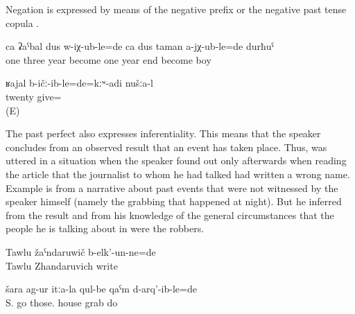 Negation is expressed by means of the negative prefix   or the negative past tense copula  .

\begin{exe}
	\ex	\label{ex:‎One boy had turned three, the other was not even one year old analytic}
	\gll	ca	ʡaˁbal	dus	w-iχ-ub-le=de	ca	dus	taman	a-jχ-ub-le=de	durħuˁ\\
		one	three	year	become		one	year	end	become	boy\\
	\glt	{}

	\ex	\label{ex:‎ ‎‎We had not given twenty analytic}
	\gll	ʁajal	b-ičː-ib-le=de=kːʷ-adi	nušːa-l\\
		twenty	give=	\\
	\glt	{} (E)
\end{exe}

The past perfect also expresses inferentiality. This means that the speaker concludes from an observed result that an event has taken place. Thus,  was uttered in a situation when the speaker found out only afterwards when reading the article that the journalist to whom he had talked had written a wrong name. Example  is from a narrative about past events that were not witnessed by the speaker himself (namely the grabbing that happened at night). But he inferred from the result and from his knowledge of the general circumstances that the people he is talking about in  were the robbers.
%
\begin{exe}
	\ex	\label{ex:(He) had (apparently) written Tawlu Zhandaruvich}
	\gll	Tawlu	žaˁndaruwič	b-elk'-un-ne=de\\
		Tawlu	Zhandaruvich	write\\
	\glt	{}

	\ex	\label{ex:‎They went to Shara and had grabbed their houses}
	\gll	šara	ag-ur	itːa-la	qul-be	qaˁm	d-arq'-ib-le=de\\
		S.	go	those.	house	grab	do\\
	\glt	{}
\end{exe}

